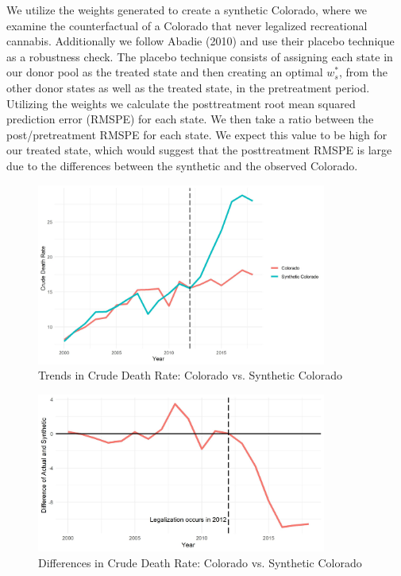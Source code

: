 \documentclass{article}
\begin{document}
We utilize the weights generated to create a synthetic Colorado, where we examine the counterfactual of a Colorado that never legalized recreational cannabis. Additionally we follow Abadie (2010) and use their placebo technique as a robustness check. The placebo technique consists of assigning each state in our donor pool as the treated state and then creating an optimal $w^{*}_s$, from the other donor states as well as the treated state, in the pretreatment period. Utilizing the weights we calculate the posttreatment root mean squared prediction error (RMSPE) for each state. We then take a ratio between the post/pretreatment RMSPE for each state. We expect this value to be high for our treated state, which would suggest that the posttreatment RMSPE is large due to the differences between the synthetic and the observed Colorado.





\begin{figure}[H]
	\begin{center}
		\includegraphics[width=0.85\textwidth]{trends_plot_colorado}
	\end{center}
	\caption{Trends in Crude Death Rate: Colorado vs. Synthetic Colorado}
	\label{fig:trends_plot_colorado}
\end{figure}

\begin{figure}[H]
	\begin{center}
		\includegraphics[width=0.85\textwidth]{diffs_plot_colorado}
	\end{center}
	\caption{Differences in Crude Death Rate: Colorado vs. Synthetic Colorado}
	\label{fig:diffs_plot_colorado}
\end{figure}
\end{document}
